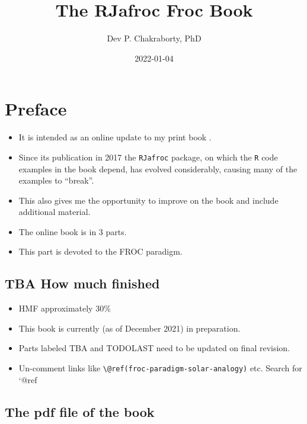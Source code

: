 \documentclass[
]{book}
\title{The RJafroc Froc Book}
\author{Dev P. Chakraborty, PhD}
\date{2022-01-04}
\providecommand{\tightlist}{%
  \setlength{\itemsep}{0pt}\setlength{\parskip}{0pt}}
\begin{document}
\maketitle

{
\setcounter{tocdepth}{1}
\tableofcontents
}
\hypertarget{preface}{%
\chapter*{Preface}\label{preface}}

\begin{itemize}
\tightlist
\item
  It is intended as an online update to my print book \citep{chakraborty2017observer}.
\item
  Since its publication in 2017 the \texttt{RJafroc} package, on which the \texttt{R} code examples in the book depend, has evolved considerably, causing many of the examples to ``break''.
\item
  This also gives me the opportunity to improve on the book and include additional material.
\item
  The online book is in 3 parts.
\item
  This part is devoted to the FROC paradigm.
\end{itemize}

\hypertarget{tba-how-much-finished}{%
\section*{TBA How much finished}\label{tba-how-much-finished}}

\begin{itemize}
\tightlist
\item
  HMF approximately 30\%
\item
  This book is currently (as of December 2021) in preparation.
\item
  Parts labeled TBA and TODOLAST need to be updated on final revision.
\item
  Un-comment links like \texttt{\textbackslash{}@ref(froc-paradigm-solar-analogy)} etc. Search for `@ref
\end{itemize}

\hypertarget{the-pdf-file-of-the-book}{%
\section*{The pdf file of the book}\label{the-pdf-file-of-the-book}}
\end{document}
